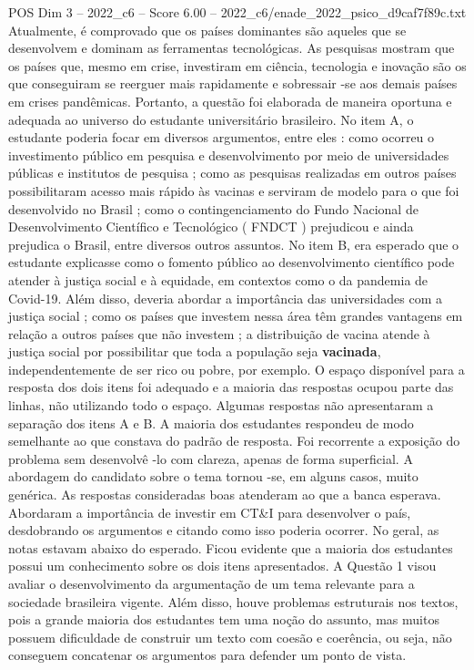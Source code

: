 \begin{textsample}{POS Dim 3 – 2022\_c6 – Score 6.00 – 2022\_c6/enade\_2022\_psico\_d9caf7f89c.txt}
Atualmente, é comprovado que os países dominantes são aqueles que se desenvolvem e dominam as ferramentas tecnológicas.
As pesquisas mostram que os países que, mesmo em crise, investiram em ciência, tecnologia e inovação são os que conseguiram se reerguer mais rapidamente e sobressair -se aos demais países em crises pandêmicas.
Portanto, a questão foi elaborada de maneira oportuna e adequada ao universo do estudante universitário brasileiro.
No item A, o estudante poderia focar em diversos argumentos, entre eles : como ocorreu o investimento público em pesquisa e desenvolvimento por meio de universidades públicas e institutos de pesquisa ; como as pesquisas realizadas em outros países possibilitaram acesso mais rápido às vacinas e serviram de modelo para o que foi desenvolvido no Brasil ; como o contingenciamento do Fundo Nacional de Desenvolvimento Científico e Tecnológico ( FNDCT ) prejudicou e ainda prejudica o Brasil, entre diversos outros assuntos.
No item B, era esperado que o estudante explicasse como o fomento público ao desenvolvimento científico pode atender à justiça social e à equidade, em contextos como o da pandemia de Covid-19.
Além disso, deveria abordar a importância das universidades com a justiça social ; como os países que investem nessa área têm grandes vantagens em relação a outros países que não investem ; a distribuição de vacina atende à justiça social por possibilitar que toda a população seja \textbf{vacinada}, independentemente de ser rico ou pobre, por exemplo.
O espaço disponível para a resposta dos dois itens foi adequado e a maioria das respostas ocupou parte das linhas, não utilizando todo o espaço.
Algumas respostas não apresentaram a separação dos itens A e B.
A maioria dos estudantes respondeu de modo semelhante ao que constava do padrão de resposta.
Foi recorrente a exposição do problema sem desenvolvê -lo com clareza, apenas de forma superficial.
A abordagem do candidato sobre o tema tornou -se, em alguns casos, muito genérica.
As respostas consideradas boas atenderam ao que a banca esperava.
Abordaram a importância de investir em CT\&I para desenvolver o país, desdobrando os argumentos e citando como isso poderia ocorrer.
No geral, as notas estavam abaixo do esperado.
Ficou evidente que a maioria dos estudantes possui um conhecimento sobre os dois itens apresentados.
A Questão 1 visou avaliar o desenvolvimento da argumentação de um tema relevante para a sociedade brasileira vigente.
Além disso, houve problemas estruturais nos textos, pois a grande maioria dos estudantes tem uma noção do assunto, mas muitos possuem dificuldade de construir um texto com coesão e coerência, ou seja, não conseguem concatenar os argumentos para defender um ponto de vista.

\end{textsample}
